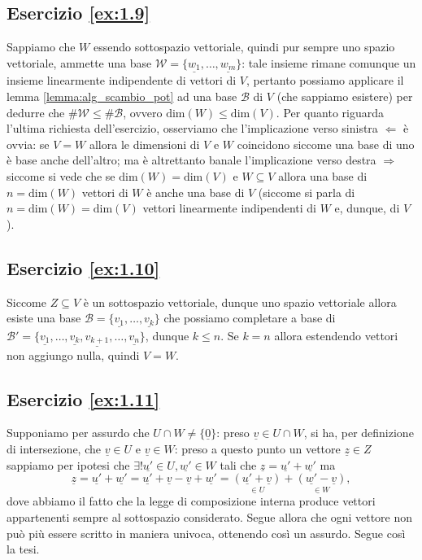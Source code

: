 \subsection*{Esercizio \ref{ex:1.9}}
Sappiamo che $W$ essendo sottospazio vettoriale, quindi pur sempre uno spazio vettoriale, ammette una base $\mathcal{W} = \{ \underline{w_1}, \ldots, \underline{w_m} \}$: tale insieme rimane comunque un insieme linearmente indipendente di vettori di $V$, pertanto possiamo applicare il lemma \ref{lemma:alg_scambio_pot} ad una base $\mathcal{B}$ di $V$ (che sappiamo esistere) per dedurre che $\# \mathcal{W} \leq \# \mathcal{B}$, ovvero $\text{dim}(W) \leq \text{dim}(V)$. Per quanto riguarda l'ultima richiesta dell'esercizio, osserviamo che l'implicazione verso sinistra $\boxed{\Leftarrow}$ è ovvia: se $V = W$ allora le dimensioni di $V$ e $W$ coincidono siccome una base di uno è base anche dell'altro; ma è altrettanto banale l'implicazione verso destra $\boxed{\Rightarrow}$ siccome si vede che se $\text{dim}(W) = \text{dim}(V)$ e $W \subseteq V$ allora una base di $n = \text{dim}(W)$ vettori di $W$ è anche una base di $V$ (siccome si parla di $n = \text{dim}(W) = \text{dim}(V)$ vettori linearmente indipendenti di $W$ e, dunque, di $V$).

\subsection*{Esercizio \ref{ex:1.10}}
Siccome $Z \subseteq V$ è un sottospazio vettoriale, dunque uno spazio vettoriale allora esiste una base $\mathcal{B} = \{ \underline{v_1}, \ldots, \underline{v_k} \}$ che possiamo completare a base di $\mathcal{B'} = \{ \underline{v_1}, \ldots, \underline{v_k}, \underline{v_{k+1}}, \ldots, \underline{v_n} \}$, dunque $k \leq n$. Se $k = n$ allora estendendo vettori non aggiungo nulla, quindi $V = W$.

\subsection*{Esercizio \ref{ex:1.11}}
Supponiamo per assurdo che $U \cap W \neq \{ \underline{0} \}$: preso $\underline{v} \in U \cap W$, si ha, per definizione di intersezione, che $\underline{v} \in U$ e $\underline{v} \in W$: preso a questo punto un vettore $\underline{z} \in Z$ sappiamo per ipotesi che $\exists! \underline{u'} \in U, \underline{w'} \in W$ tali che $\underline{z} = \underline{u'} + \underline{w'}$ ma
$$
    \underline{z} = \underline{u'} + \underline{w'} = \underline{u'} + \underline{v} - \underline{v} + \underline{w'} = \underset{\in U}{(\underline{u'} + \underline{v})} + \underset{\in W}{(\underline{w'} - \underline{v})},
$$
dove abbiamo il fatto che la legge di composizione interna produce vettori appartenenti sempre al sottospazio considerato. Segue allora che ogni vettore non può più essere scritto in maniera univoca, ottenendo così un assurdo. Segue così la tesi.
